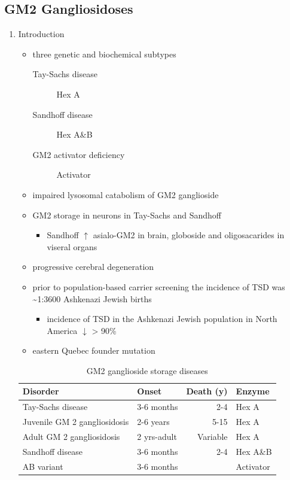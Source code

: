 \documentclass{scrartcl}
\begin{document}
\subsection{GM2 Gangliosidoses}
\label{sec:org87ab9a9}
\begin{enumerate}
\item Introduction
\label{sec:orgb9b0bb1}
\begin{itemize}
\item three genetic and biochemical subtypes
\begin{description}
\item[{Tay-Sachs disease}] Hex A
\item[{Sandhoff disease}] Hex A\&B
\item[{GM2 activator deficiency}] Activator
\end{description}
\item impaired lysosomal catabolism of GM2 ganglioside
\item GM2 storage in neurons in Tay-Sachs and Sandhoff
\begin{itemize}
\item Sandhoff \(\uparrow\) asialo-GM2 in brain, globoside and oligosacarides in viseral organs
\end{itemize}
\item progressive cerebral degeneration
\item prior to population-based carrier screening the incidence of TSD was \textasciitilde{}1:3600 Ashkenazi Jewish births
\begin{itemize}
\item incidence of TSD in the Ashkenazi Jewish population in North America \(\downarrow\) > 90\%
\end{itemize}
\item eastern Quebec founder mutation
\end{itemize}

\begin{table}[htbp]
\caption{\label{tab:org3dc8e86}
GM2 ganglioside storage diseases}
\centering
\begin{tabular}{llrl}
Disorder & Onset & Death (y) & Enzyme\\
\hline
Tay-Sachs disease & 3-6 months & 2-4 & Hex A\\
Juvenile GM 2 gangliosidosis & 2-6 years & 5-15 & Hex A\\
Adult GM 2 gangliosidosis & 2 yrs-adult & Variable & Hex A\\
\hline
Sandhoff disease & 3-6 months & 2-4 & Hex A\&B\\
AB variant & 3-6 months &  & Activator\\
\end{tabular}
\end{table}


\end{enumerate}
\end{document}
